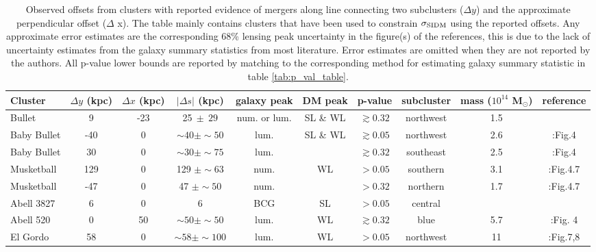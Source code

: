 \begin{table*}
	\centering
	 \caption{Observed offsets from clusters with reported evidence of mergers
		 along line connecting two subclusters ($\Delta y$) and the approximate 
		 perpendicular offset ($\Delta$ x).
		 The table mainly contains clusters that have been used to constrain
		 $\sigma_{\rm SIDM}$ using the reported offsets.
	 Any approximate  
	 error estimates are the corresponding 68\% lensing peak uncertainty
	 in the figure(s) of the references, this is due to the lack of uncertainty
	 estimates from the galaxy summary statistics from most literature. 
		Error estimates are omitted when they are not reported by the authors.  
	 All p-value lower bounds are reported by matching to the corresponding method for
	 estimating galaxy summary statistic in table \ref{tab:p_val_table}.
	 \label{tab:offset_results}} 
	 \begin{tabular}{@{}lccccccccc@{}}
	 \hline 
	 Cluster &$\Delta y$ (kpc) & $\Delta x$ (kpc) & $|\Delta s|$ (kpc) & galaxy peak & DM peak &  p-value & subcluster &
	 mass ($10^{14}$ M$_\odot$)  &  reference\\
	 \hline
	 Bullet  & 9  & -23 & 25$~\pm~29$ & num. or lum. & SL \& WL & $\gtrsim 0.32$ &
	 northwest & 1.5 & \citealt{Randall2008d}\\
	 Baby Bullet & -40&  0 & $\sim 40 \pm \sim 50 $  & lum. & SL \& WL &
	 $\gtrsim 0.05 $ & northwest & 2.6 &
	 \citealt{Bradac2008}:Fig.4 \\
	 Baby Bullet & 30  & 0 & $\sim 30 \pm \sim 75 $ & lum. & & $\gtrsim
	 0.32 $&
	 southeast
	  & 2.5 & \citealt{Bradac2008}:Fig.4 \\
	 Musketball &  129 & 0 & 129 $\pm \sim 63$ & num. & WL & $>0.05$ &
	southern & 3.1 
	 & \citealt{Dawson2013}:Fig.4.7\\
	 Musketball & -47 & 0 & 47 $\pm \sim 50$ & num. & & $>0.32$ &
	 northern & 1.7 &  
	  \citealt{Dawson2013}:Fig.4.7\\
		Abell 3827 & 6 & 0 & 6 & BCG & SL & $> 0.05$ & central & & \citealt{Williams2011a}\\ 
		Abell 520 & 0 & 50& $\sim 50 \pm \sim 50$ & lum. & WL & $\gtrsim 0.32$ & blue 
		 & 5.7 & \citealt{Clowe2012}:Fig. 4 \\
		El Gordo &  58 &0 & $\sim 58 \pm \sim 100$ & lum. & WL & $>0.05$ & 
		northwest& 11  &\citealt{Jee2014}:Fig.7,8  \\

\end{tabular}
\end{table*}
